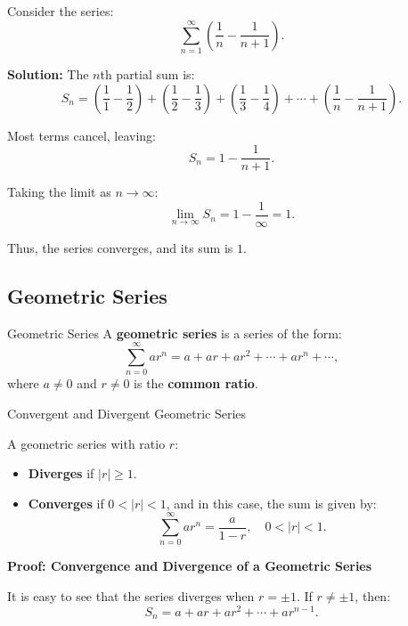 \documentclass[12pt]{article}
\theoremstyle{beautifulthm}
\begin{document}
\begin{tcolorbox}[colback=examplebg, colframe=red!75!black, title=\textbf{EXAMPLE 9: Telescoping Series}, fonttitle=\bfseries, sharp corners]

Consider the series:
\[
\sum_{n=1}^\infty \left( \frac{1}{n} - \frac{1}{n+1} \right).
\]

\tcblower
\textbf{Solution:} 
The $n$th partial sum is:
\[
S_n = \left( \frac{1}{1} - \frac{1}{2} \right) + \left( \frac{1}{2} - \frac{1}{3} \right) + \left( \frac{1}{3} - \frac{1}{4} \right) + \cdots + \left( \frac{1}{n} - \frac{1}{n+1} \right).
\]

Most terms cancel, leaving:
\[
S_n = 1 - \frac{1}{n+1}.
\]

Taking the limit as $n \to \infty$:
\[
\lim_{n \to \infty} S_n = 1 - \frac{1}{\infty} = 1.
\]

Thus, the series converges, and its sum is $1$.
\end{tcolorbox}


\newpage
\subsection{Geometric Series}

\begin{Definition}{Geometric Series}{}
    A \textbf{geometric series} is a series of the form:
\[
\sum_{n=0}^\infty ar^n = a + ar + ar^2 + \cdots + ar^n + \cdots,
\]
where $a \neq 0$ and $r \neq 0$ is the \textbf{common ratio}.
\end{Definition}


\begin{mytheorem}{Convergent and Divergent Geometric Series}{}
    
A geometric series with ratio $r$:
\begin{itemize}
    \item \textbf{Diverges} if $\lvert r \rvert \geq 1$.
    \item \textbf{Converges} if $0 < \lvert r \rvert < 1$, and in this case, the sum is given by:
    \[
    \sum_{n=0}^\infty ar^n = \frac{a}{1 - r}, \quad 0 < \lvert r \rvert < 1.
    \]
\end{itemize}
\end{mytheorem}

\textbf{Proof: Convergence and Divergence of a Geometric Series}

It is easy to see that the series diverges when $r = \pm 1$. If $r \neq \pm 1$, then:
\[
S_n = a + ar + ar^2 + \cdots + ar^{n-1}.
\]
\end{document}
